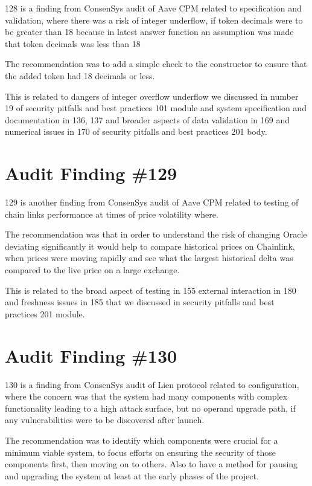 128 is a finding from ConsenSys audit of Aave CPM related to specification and validation, where there was a risk of integer underflow, if token decimals were to be greater than 18 because in latest answer function an assumption was made that token decimals was less than 18

The recommendation was to add a simple check to the constructor to ensure that the added token had 18 decimals or less.

This is related to dangers of integer overflow underflow we discussed in number 19 of security pitfalls and best practices 101 module and system specification and documentation in 136, 137 and broader aspects of data validation in 169 and numerical issues in 170 of security pitfalls and best practices 201 body.

\section{Audit Finding \#129}

129 is another finding from ConsenSys audit of Aave CPM related to testing of chain links performance at times of price volatility where.

The recommendation was that in order to understand the risk of changing Oracle deviating significantly it would help to compare historical prices on Chainlink, when prices were moving rapidly and see what the largest historical delta was compared to the live price on a large exchange.

This is related to the broad aspect of testing in 155 external interaction in 180 and freshness issues in 185 that we discussed in security pitfalls and best practices 201 module.

\section{Audit Finding \#130}

130 is a finding from ConsenSys audit of Lien protocol related to configuration, where the concern was that the system had many components with complex functionality leading to a high attack surface, but no operand upgrade path, if any vulnerabilities were to be discovered after launch.

The recommendation was to identify which components were crucial for a minimum viable system, to focus efforts on ensuring the security of those components first, then moving on to others. Also to have a method for pausing and upgrading the system at least at the early phases of the project.


